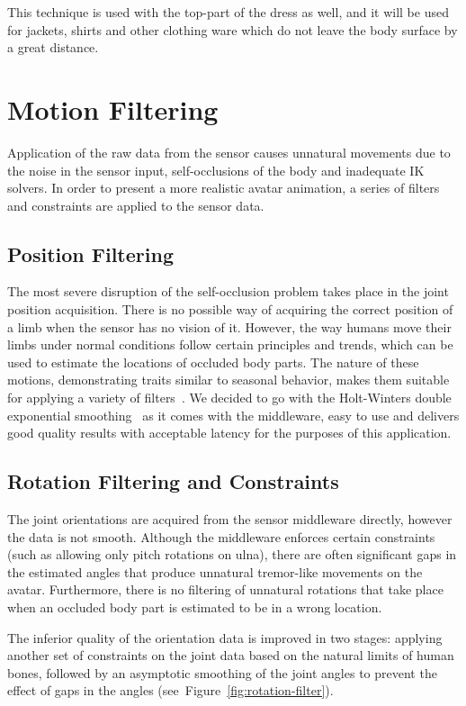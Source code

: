 This technique is used with the top-part of the dress as well, and it will be used for jackets, shirts and other clothing ware which do not leave the body surface by a great distance. 


\section{Motion Filtering}
\label{section_motion_filtering}

Application of the raw data from the sensor causes unnatural movements due to the noise in the sensor input, self-occlusions of the body and inadequate IK solvers.  In order to present a more realistic avatar animation, a series of filters and constraints are applied to the sensor data. 

\subsection{Position Filtering}
The most severe disruption of the self-occlusion problem takes place in the joint position acquisition. There is no possible way of acquiring the correct position of a limb when the sensor has no vision of it. However, the way humans move their limbs under normal conditions follow certain principles and trends, which can be used to estimate the locations of occluded body parts. The nature of these motions, demonstrating traits similar to seasonal behavior, makes them suitable for applying a variety of filters~\cite{Azimi2012}. We decided to go with the Holt-Winters double exponential smoothing~\cite{Holt2004,Kalekar2004} as it comes with the middleware, easy to use and delivers good quality results with acceptable latency for the purposes of this application. 

\subsection{Rotation Filtering and Constraints}
The joint orientations are acquired from the sensor middleware directly, however the data is not smooth. Although the middleware enforces certain constraints (such as allowing only pitch rotations on ulna), there are often significant gaps in the estimated angles that produce unnatural tremor-like movements on the avatar. Furthermore, there is no filtering of unnatural rotations that take place when an occluded body part is estimated to be in a wrong location. 

The inferior quality of the orientation data is improved in two stages: applying another set of constraints on the joint data based on the natural limits of human bones, followed by an asymptotic smoothing of the joint angles to prevent the effect of gaps in the angles (see~Figure~\ref{fig:rotation-filter}). 

